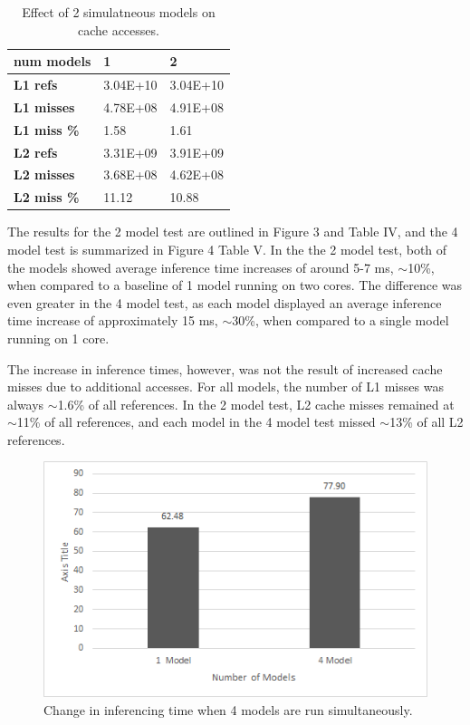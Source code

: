 \begin{table}[h]
\centering
  \begin{tabular} {| l | l | l |}
  \hline
  \textbf{num models} & 1 & 2 \\ \hline
  \textbf{L1 refs} &  3.04E+10 &  3.04E+10 \\ \hline
  \textbf{L1 misses} & 4.78E+08 & 4.91E+08 \\ \hline
  \textbf{L1 miss \%} & 1.58 & 1.61 \\ \hline
  \textbf{L2 refs} & 3.31E+09 &  3.91E+09 \\ \hline
  \textbf{L2 misses} & 3.68E+08 & 4.62E+08 \\ \hline
  \textbf{L2 miss \%} & 11.12 & 10.88 \\ \hline
  \end{tabular}
  \caption{ Effect of 2 simulatneous models on cache accesses. }
\end{table}

The results for the 2 model test are outlined in Figure 3 and Table IV, and the 4 model test is summarized in 
Figure 4 Table V. In the the 2 model test, both of the models showed average inference time increases of around 
5-7 ms, $\sim$10\%, when compared to a baseline of 1 model running on two cores. The difference was even 
greater in the 4 model test, as each model displayed an average inference time increase of 
approximately 15 ms, $\sim$30\%, when compared to a single model running on 1 core.

The increase in inference times, however, was not the result of increased cache misses due to 
additional accesses. For all models, the number of L1 misses was always $\sim$1.6\% of all 
references. In the 2 model test, L2 cache misses remained at $\sim$11\% of all references, and each 
model in the 4 model test missed $\sim$13\% of all L2 references.

\begin{figure}[h]
  \centering
  \includegraphics[width=.5\textwidth]{figs/4ModelChart}
  \caption{Change in inferencing time when 4 models are run simultaneously. }
\end{figure}


